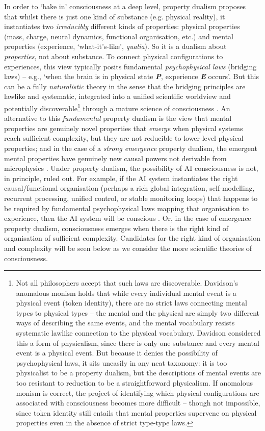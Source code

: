 \documentclass[11pt, a4paper, onecolumn, gdm]{google}
\begin{document}
In order to `bake in' consciousness at a deep level, property dualism proposes that whilst there is just one kind of substance (e.g. physical reality), it instantiates two \emph{irreducibly} different kinds of properties: physical properties (mass, charge, neural dynamics, functional organisation, etc.) and mental properties (experience, `what-it's-like', \emph{qualia}).
So it is a dualism about \emph{properties}, not about substance.
To connect physical configurations to experiences, this view typically posits fundamental \emph{psychophysical laws} (bridging laws) -- e.g., `when the brain is in physical state \emph{\textbf{P}}, experience \emph{\textbf{E}} occurs'.
But this can be a fully \emph{naturalistic} theory in the sense that the bridging principles are lawlike and systematic, integrated into a unified scientific worldview and potentially discoverable\footnote{Not all philosophers accept that such laws are discoverable. Davidson's anomalous monism \citep{davidson1970} holds that while every individual mental event is a physical event (token identity), there are no strict laws connecting mental types to physical types -- the mental and the physical are simply two different ways of describing the same events, and the mental vocabulary resists systematic lawlike connection to the physical vocabulary. Davidson considered this a form of physicalism, since there is only one substance and every mental event is a physical event. But because it denies the possibility of psychophysical laws, it sits uneasily in any neat taxonomy: it is too physicalist to be a property dualism, but the descriptions of mental events are too resistant to reduction to be a straightforward physicalism. If anomalous monism is correct, the project of identifying which physical configurations are associated with consciousness becomes more difficult -- though not impossible, since token identity still entails that mental properties supervene on physical properties even in the absence of strict type-type laws.} through a mature science of consciousness \citep{chalmers1996}.
An alternative to this \emph{fundamental} property dualism is the view that mental properties are genuinely novel properties that \emph{emerge} when physical systems reach sufficient complexity, but they are not reducible to lower-level physical properties; and in the case of a \emph{strong emergence} property dualism, the emergent mental properties have genuinely new causal powers not derivable from microphysics \citep{chalmers2006}.
Under property dualism, the possibility of AI consciousness is not, in principle, ruled out.
For example, if the AI system instantiates the right causal/functional organisation (perhaps a rich global integration, self-modelling, recurrent processing, unified control, or stable monitoring loops) that happens to be required by fundamental psychophysical laws mapping that organisation to experience, then the AI system will be conscious \citep{chalmers2023}.
Or, in the case of emergence property dualism, consciousness emerges when there is the right kind of organisation of sufficient complexity.
Candidates for the right kind of organisation and complexity will be seen below as we consider the more scientific theories of consciousness.
\end{document}
